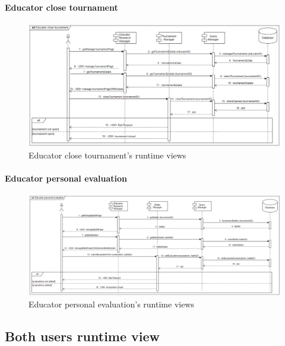 \documentclass[12pt, a4paper]{report}
\begin{document}
    \paragraph*{Educator close tournament}
    \begin{figure}[H]
        \centering
        \includegraphics[width=1.0\linewidth]{images/ectrv1.png}
        \caption{Educator close tournament's runtime views}
    \end{figure}

    \paragraph*{Educator personal evaluation}
    \begin{figure}[H]
        \centering
        \includegraphics[width=1.0\linewidth]{images/eperv.png}
        \caption{Educator personal evaluation's runtime views}
    \end{figure}


    \subsection{Both users runtime view}
\end{document}
